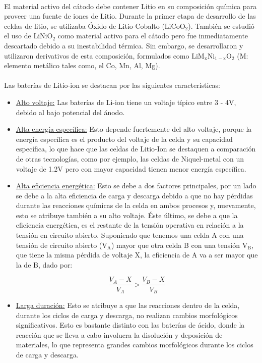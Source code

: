\documentclass[10pt,a4paper]{article}
\begin{document}
	\\
	El material activo del cátodo debe contener Litio en su composición química para proveer una fuente de iones de Litio. Durante la primer etapa de desarrollo de las celdas de litio, se utilizaba Óxido de Litio-Cobalto ($\mathrm{LiCoO_2}$). También se estudió el uso de $\mathrm{LiNiO_2}$ como material activo para el cátodo pero fue inmediatamente descartado debido a su inestabilidad térmica. Sin embargo, se desarrollaron y utilizaron derivativos de esta composición, formulados como $\mathrm{LiM_xNi_{1-x}O_2}$ (M: elemento metálico tales como, el Co, Mn, Al, Mg).\\
	\\
	Las baterías de Litio-ion se destacan por las siguientes características:
	\begin{itemize}
		\item \underline{Alto voltaje:} Las baterías de Li-ion tiene un voltaje típico entre 3 - 4V, debido al bajo potencial del ánodo.
		\item \underline{Alta energía específica:} Esto depende fuertemente del alto voltaje, porque la energía específica es el producto del voltaje de la celda y su capacidad específica, lo que hace que las celdas de Litio-Ion se destaquen a comparación de otras tecnologías, como por ejemplo, las celdas de Niquel-metal con un voltaje de 1.2V pero con mayor capacidad tienen menor energía específica. 
		\item \underline{Alta eficiencia energética:} Esto se debe a dos factores principales, por un lado se debe a la alta eficiencia de carga y descarga debido a que no hay pérdidas durante las reacciones químicas de la celda en ambos procesos y, nuevamente, esto se atribuye también a su alto voltaje. Éste último, se debe a que la eficiencia energética, es el restante de la tensión operativa en relación a la tensión en circuito abierto. Suponiendo que tenemos una celda A con una tensión de circuito abierto ($\mathrm{V_A}$) mayor que otra celda  B con una tensión $\mathrm{V_B}$, que tiene la misma pérdida de voltaje X, la eficiencia de A va a ser mayor que la de B, dado por:
		
		\clearpage
		\begin{equation}
			\frac{V_A - X}{V_A} > \frac{V_B - X}{V_B} \nonumber
		\end{equation}
		\item \underline{Larga duración:} Esto se atribuye a que las reacciones dentro de la celda, durante los ciclos de carga y descarga, no realizan cambios morfológicos significativos. Esto es bastante distinto con las baterías de ácido, donde la reacción que se lleva a cabo involucra la disolución y deposición de materiales, lo que representa grandes cambios morfológicos durante los ciclos de carga y descarga.
		
	\end{itemize}
	
\end{document}
